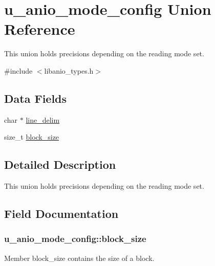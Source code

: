 \hypertarget{unionu__anio__mode__config}{}\section{u\+\_\+anio\+\_\+mode\+\_\+config Union Reference}
\label{unionu__anio__mode__config}


This union holds precisions depending on the reading mode set.  




{\ttfamily \#include $<$libanio\+\_\+types.\+h$>$}

\subsection*{Data Fields}
\begin{DoxyCompactItemize}
\item 
char $\ast$ \hyperlink{unionu__anio__mode__config_ad7eb0740f3431ba4cd248f59d2c3a59b}{line\+\_\+delim}
\item 
size\+\_\+t \hyperlink{unionu__anio__mode__config_a677bc5720f0d8e1d14e5795a8c364f73}{block\+\_\+size}
\end{DoxyCompactItemize}


\subsection{Detailed Description}
This union holds precisions depending on the reading mode set. 

\subsection{Field Documentation}
\hypertarget{unionu__anio__mode__config_a677bc5720f0d8e1d14e5795a8c364f73}{}
\subsubsection[{block\+\_\+size}]{\setlength{\rightskip}{0pt plus 5cm}u\+\_\+anio\+\_\+mode\+\_\+config\+::block\+\_\+size}\label{unionu__anio__mode__config_a677bc5720f0d8e1d14e5795a8c364f73}
Member \textquotesingle{}block\+\_\+size\textquotesingle{} contains the size of a block. \hypertarget{unionu__anio__mode__config_ad7eb0740f3431ba4cd248f59d2c3a59b}{}
